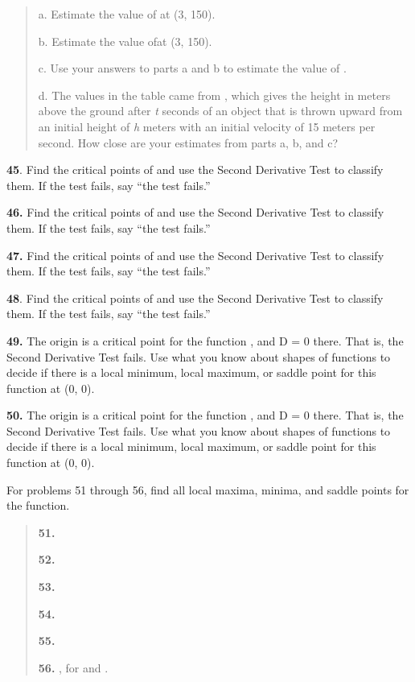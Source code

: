 \begin{quote}
a. Estimate the value of at (3, 150).

b. Estimate the value ofat (3, 150).

c. Use your answers to parts a and b to estimate the value of .

d. The values in the table came from , which gives the height in meters
above the ground after \emph{t} seconds of an object that is thrown
upward from an initial height of \emph{h} meters with an initial
velocity of 15 meters per second. How close are your estimates from
parts a, b, and c?
\end{quote}

\textbf{45}. Find the critical points of and use the Second Derivative
Test to classify them. If the test fails, say ``the test fails.''

\textbf{46.} Find the critical points of and use the Second Derivative
Test to classify them. If the test fails, say ``the test fails.''

\textbf{47.} Find the critical points of and use the Second Derivative
Test to classify them. If the test fails, say ``the test fails.''

\textbf{48}. Find the critical points of and use the Second Derivative
Test to classify them. If the test fails, say ``the test fails.''

\textbf{49.} The origin is a critical point for the function , and D = 0
there. That is, the Second Derivative Test fails. Use what you know
about shapes of functions to decide if there is a local minimum, local
maximum, or saddle point for this function at (0, 0).

\textbf{50.} The origin is a critical point for the function , and D = 0
there. That is, the Second Derivative Test fails. Use what you know
about shapes of functions to decide if there is a local minimum, local
maximum, or saddle point for this function at (0, 0).

For problems 51 through 56, find all local maxima, minima, and saddle
points for the function.

\begin{quote}
\textbf{51.}

\textbf{52.}

\textbf{53.}

\textbf{54.}

\textbf{55.}

\textbf{56.} , for and .
\end{quote}

